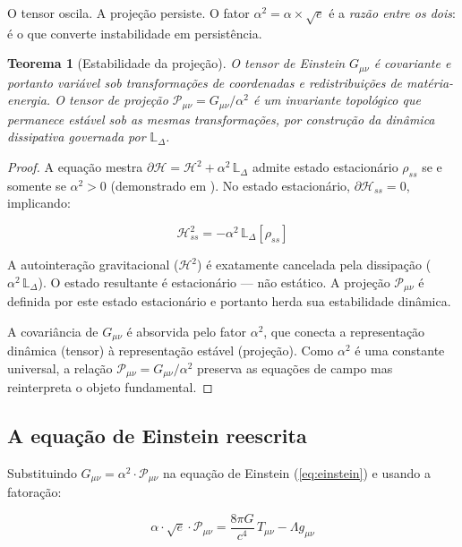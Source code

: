 \documentclass[12pt,a4paper,twoside]{article}
\newtheorem{theorem}{Teorema}[section]
\newcommand{\alphaii}{\alpha^{2}}
\begin{document}
O tensor oscila. A projeção persiste. O fator $\alphaii = \alpha \times \sqrt{e}$ é a \textit{razão entre os dois}: é o que converte instabilidade em persistência.

\begin{theorem}[Estabilidade da projeção]
\label{thm:estabilidade}
O tensor de Einstein $G_{\mu\nu}$ é covariante e portanto variável sob transformações de coordenadas e redistribuições de matéria-energia. O tensor de projeção $\mathcal{P}_{\mu\nu} = G_{\mu\nu}/\alphaii$ é um invariante topológico que permanece estável sob as mesmas transformações, por construção da dinâmica dissipativa governada por $\mathbb{L}_\Delta$.
\end{theorem}

\begin{proof}
A equação mestra $\partial\mathcal{H} = \mathcal{H}^2 + \alphaii\,\mathbb{L}_\Delta$ admite estado estacionário $\rho_{ss}$ se e somente se $\alphaii > 0$ (demonstrado em \cite{Miguel2025Alpha2}). No estado estacionário, $\partial\mathcal{H}_{ss} = 0$, implicando:

\begin{equation}
\mathcal{H}_{ss}^2 = -\alphaii\,\mathbb{L}_\Delta[\rho_{ss}]
\end{equation}

A autointeração gravitacional ($\mathcal{H}^2$) é exatamente cancelada pela dissipação ($\alphaii\,\mathbb{L}_\Delta$). O estado resultante é estacionário --- não estático. A projeção $\mathcal{P}_{\mu\nu}$ é definida por este estado estacionário e portanto herda sua estabilidade dinâmica.

A covariância de $G_{\mu\nu}$ é absorvida pelo fator $\alphaii$, que conecta a representação dinâmica (tensor) à representação estável (projeção). Como $\alphaii$ é uma constante universal, a relação $\mathcal{P}_{\mu\nu} = G_{\mu\nu}/\alphaii$ preserva as equações de campo mas reinterpreta o objeto fundamental.
\end{proof}


\subsection{A equação de Einstein reescrita}

Substituindo $G_{\mu\nu} = \alphaii \cdot \mathcal{P}_{\mu\nu}$ na equação de Einstein (\ref{eq:einstein}) e usando a fatoração:

\begin{equationbox}[title={Equação de Einstein na TGL}]
\begin{equation}
\boxed{\alpha \cdot \sqrt{e} \cdot \mathcal{P}_{\mu\nu} = \frac{8\pi G}{c^4}\, T_{\mu\nu} - \Lambda g_{\mu\nu}}
\label{eq:einstein_tgl}
\end{equation}
\end{equationbox}
\end{document}
